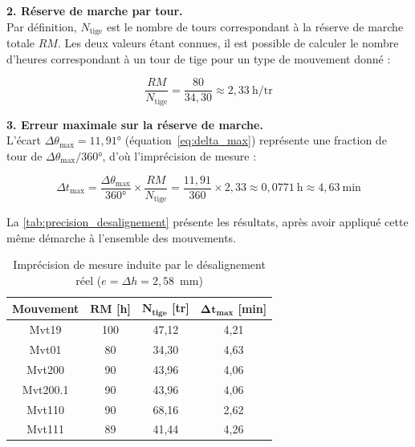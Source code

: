 \textbf{2. Réserve de marche par tour.\\} Par définition, $N_{\text{tige}}$ est le nombre de tours
correspondant à la réserve de marche totale $RM$. Les deux valeurs étant connues, il est possible de calculer le nombre d'heures correspondant à un tour de
tige pour un type de mouvement donné :

\begin{equation}
  \frac{RM}{N_{\text{tige}}} = \frac{80}{34{,}30} \approx 2{,}33\ \text{h/tr}
  \label{eq:rm_par_tour}
\end{equation}

\textbf{3. Erreur maximale sur la réserve de marche.\\} L'écart
$\Delta\theta_{\text{max}}=11{,}91°$ (équation~\eqref{eq:delta_max})
représente une fraction de tour de $\Delta\theta_{\text{max}}/360°$, d'où
l'imprécision de mesure :

\begin{equation}
  \Delta t_{\text{max}} = \frac{\Delta\theta_{\text{max}}}{360°}\times\frac{RM}{N_{\text{tige}}}
  = \frac{11{,}91}{360}\times 2{,}33 \approx 0{,}0771\ \text{h} \approx 4{,}63\ \text{min}
  \label{eq:dt_max}
\end{equation}

La \autoref{tab:precision_desalignement} présente les résultats, après avoir appliqué cette même démarche à
l'ensemble des mouvements.

\begin{table}[H]
  \centering
  \caption{Imprécision de mesure induite par le désalignement réel ($e=\Delta h=2{,}58$~mm)}
  \label{tab:precision_desalignement}
  \begin{tabular}{|c|c|c|c|}
    \hline
    \textbf{Mouvement} & $\boldsymbol{RM}$ \textbf{[h]} & $\boldsymbol{N_{\text{tige}}}$ \textbf{[tr]} & $\boldsymbol{\Delta t_{\text{max}}}$ \textbf{[min]} \\
    \hline
    Mvt19    & 100 & 47{,}12 & 4{,}21 \\
    Mvt01    & 80  & 34{,}30 & 4{,}63 \\
    Mvt200   & 90  & 43{,}96 & 4{,}06 \\
    Mvt200.1 & 90  & 43{,}96 & 4{,}06 \\
    Mvt110   & 90  & 68{,}16 & 2{,}62 \\
    Mvt111   & 89  & 41{,}44 & 4{,}26 \\
    \hline
  \end{tabular}
\end{table}

